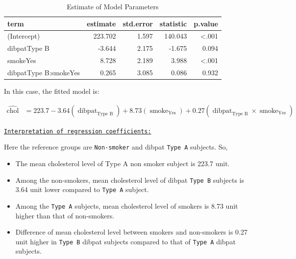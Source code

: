 \documentclass[
  12pt,
  oneside]{article}
\providecommand{\tightlist}{%
  \setlength{\itemsep}{0pt}\setlength{\parskip}{0pt}}
\begin{document}
\begin{table}[H]

\caption{\label{tab:Table-11}Estimate of Model Parameters}
\centering
\begin{tabular}[t]{lrrrr}
\toprule
term & estimate & std.error & statistic & p.value\\
\midrule
(Intercept) & 223.702 & 1.597 & 140.043 & <.001\\
dibpatType B & -3.644 & 2.175 & -1.675 & 0.094\\
smokeYes & 8.728 & 2.189 & 3.988 & <.001\\
dibpatType B:smokeYes & 0.265 & 3.085 & 0.086 & 0.932\\
\bottomrule
\end{tabular}
\end{table}

In this case, the fitted model is:

\begin{equation}
\label{eq: eq6}
\begin{aligned}
\operatorname{\widehat{chol}} &= 223.7 - 3.64(\operatorname{dibpat}_{\operatorname{Type\ B}}) + 8.73(\operatorname{smoke}_{\operatorname{Yes}}) + 0.27(\operatorname{dibpat}_{\operatorname{Type\ B}} \times \operatorname{smoke}_{\operatorname{Yes}})
\end{aligned}
\end{equation}

\underline{\texttt{Interpretation of regression coefficients:}}

Here the reference groups are \texttt{Non-smoker} and dibpat \texttt{Type\ A} subjects. So,

\begin{itemize}
\tightlist
\item
  The mean cholesterol level of Type A non smoker subject is 223.7 unit.
\item
  Among the non-smokers, mean cholesterol level of dibpat \texttt{Type\ B} subjects is 3.64 unit lower compared to \texttt{Type\ A} subject.
\item
  Among the \texttt{Type\ A} subjects, mean cholesterol level of smokers is 8.73 unit higher than that of non-smokers.
\item
  Difference of mean cholesterol level between smokers and non-smokers is 0.27 unit higher in \texttt{Type\ B} dibpat subjects compared to that of \texttt{Type\ A} dibpat subjects.
\end{itemize}

\clearpage
\end{document}
